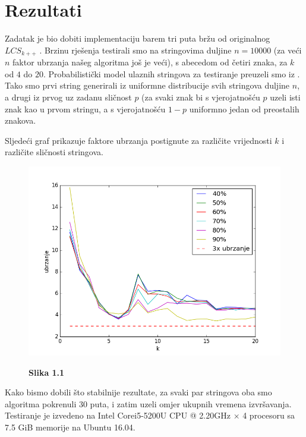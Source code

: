 \documentclass[times, utf8, seminar, numeric]{fer}
\begin{document}
\chapter{Rezultati}
Zadatak je bio dobiti implementaciju barem tri puta bržu od
originalnog $LCS_{k++}$ \cite{github}. Brzinu rješenja testirali
smo na stringovima duljine $n = 10000$ (za veći $n$ faktor ubrzanja
našeg algoritma još je veći), s abecedom od četiri znaka, za $k$ od
$4$ do $20$. Probabilistički model ulaznih stringova za testiranje
preuzeli smo iz \cite{Pavetic}. Tako smo prvi string generirali iz
uniformne distribucije svih stringova duljine $n$, a drugi iz prvog
uz zadanu sličnost $p$ (za svaki znak bi s vjerojatnošću $p$ uzeli
isti znak kao u prvom stringu, a s vjerojatnošću $1-p$ uniformno
jedan od preostalih znakova.

Sljedeći graf prikazuje faktore ubrzanja postignute za različite
vrijednosti $k$ i različite sličnosti stringova. 

\begin{figure}
  \begin{center}
    \includegraphics{../../test/speedplot.png}
  \end{center}
  \centering
  \textbf{Slika 1.1}  
\end{figure}

Kako bismo dobili što stabilnije rezultate, za svaki par stringova oba
smo algoritma pokrenuli $30$ puta, i zatim uzeli omjer ukupnih vremena
izvršavanja. Testiranje je izvedeno na Intel\textregistered  
Core\texttrademark   i5-5200U CPU @ 2.20GHz $\times$ 4 procesoru sa 7.5
GiB memorije na Ubuntu 16.04.
\end{document}
